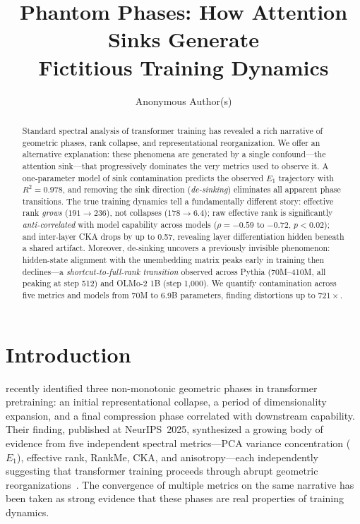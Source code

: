 \documentclass[11pt]{article}
\title{Phantom Phases: How Attention Sinks Generate\\Fictitious Training Dynamics}
\author{Anonymous Author(s)}
\date{}
\begin{document}
\maketitle

\begin{abstract}
Standard spectral analysis of transformer training has revealed a rich narrative of geometric phases, rank collapse, and representational reorganization.
We offer an alternative explanation: these phenomena are generated by a single confound---the attention sink---that progressively dominates the very metrics used to observe it.
A one-parameter model of sink contamination predicts the observed $E_1$ trajectory with $R^2 = 0.978$, and removing the sink direction (\emph{de-sinking}) eliminates all apparent phase transitions.
The true training dynamics tell a fundamentally different story: effective rank \emph{grows} ($191 \to 236$), not collapses ($178 \to 6.4$); raw effective rank is significantly \emph{anti-correlated} with model capability across models ($\rho = -0.59$ to $-0.72$, $p < 0.02$); and inter-layer CKA drops by up to 0.57, revealing layer differentiation hidden beneath a shared artifact.
Moreover, de-sinking uncovers a previously invisible phenomenon: hidden-state alignment with the unembedding matrix peaks early in training then declines---a \emph{shortcut-to-full-rank transition} observed across Pythia (70M--410M, all peaking at step 512) and OLMo-2 1B (step 1{,}000).
We quantify contamination across five metrics and models from 70M to 6.9B parameters, finding distortions up to $721\times$.
\end{abstract}

\section{Introduction}\label{sec:intro}

\citet{li2025tracing} recently identified three non-monotonic geometric phases in transformer pretraining: an initial representational collapse, a period of dimensionality expansion, and a final compression phase correlated with downstream capability.
Their finding, published at NeurIPS~2025, synthesized a growing body of evidence from five independent spectral metrics---PCA variance concentration ($E_1$), effective rank, RankMe, CKA, and anisotropy---each independently suggesting that transformer training proceeds through abrupt geometric reorganizations~\citep{garrido2023rankme,ethayarajh2019contextual,raghu2021vision,timkey2021all}.
The convergence of multiple metrics on the same narrative has been taken as strong evidence that these phases are real properties of training dynamics.
\end{document}

